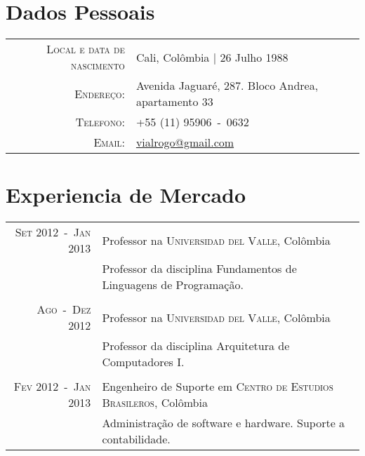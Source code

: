 \documentclass[a4paper,10pt]{article}
\begin{document}
\pagestyle{empty} %

\par{\bigskip\par}

\section{Dados Pessoais}

\begin{tabular}{rl}
  \textsc{Local e data de nascimento} & Cali, Colômbia  | 26 Julho 1988 \\
  \textsc{Endereço:}                  & Avenida Jaguaré, 287. Bloco Andrea, apartamento 33 \\
  \textsc{Telefono:}                  & +55 (11) 95906~-~0632 \\
  \textsc{Email:}                     & \href{mailto:vialrogo@gmail.com}{vialrogo@gmail.com} \\
\end{tabular}

\section{Experiencia de Mercado}
\begin{tabular}{rl}

  \textsc{Set 2012~-~Jan 2013}  & Professor na \textsc{Universidad del Valle}, Colômbia \\
                                &\footnotesize{Professor da disciplina Fundamentos de Linguagens de Programação.} \\
                                &\\

  \textsc{Ago~-~Dez 2012}       & Professor na \textsc{Universidad del Valle}, Colômbia \\
                                &\footnotesize{Professor da disciplina Arquitetura de Computadores I.} \\
                                &\\

  \textsc{Fev 2012~-~Jan 2013}  & Engenheiro de Suporte em \textsc{Centro de Estudios Brasileros}, Colômbia \\
                                &\footnotesize{Administração de software e hardware. Suporte a contabilidade.} \\

\end{tabular}
\end{document}
